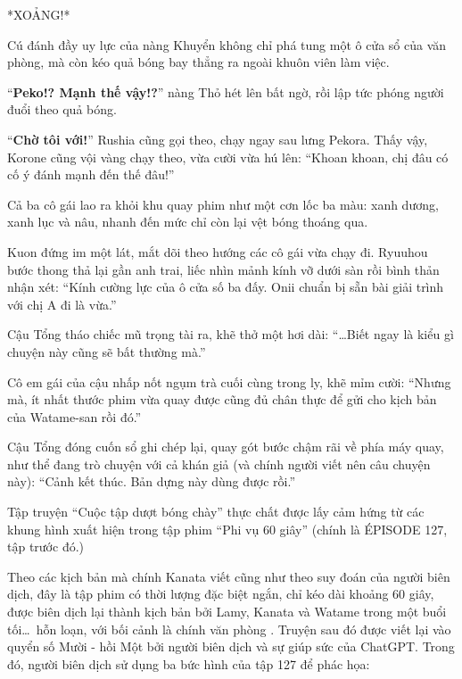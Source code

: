 \documentclass[../main.tex]{subfiles}
\begin{document}
*XOẢNG!*

Cú đánh đầy uy lực của nàng Khuyển không chỉ phá tung một ô cửa sổ của văn phòng, mà còn kéo quả bóng bay thẳng ra ngoài khuôn viên làm việc.

``\textbf{Peko!? Mạnh thế vậy!?}'' nàng Thỏ hét lên bất ngờ, rồi lập tức phóng người đuổi theo quả bóng.

``\textbf{Chờ tôi với!}'' Rushia cũng gọi theo, chạy ngay sau lưng Pekora. Thấy vậy, Korone cũng vội vàng chạy theo, vừa cười vừa hú lên: ``Khoan khoan, chị đâu có cố ý đánh mạnh đến thế đâu!''

Cả ba cô gái lao ra khỏi khu quay phim như một cơn lốc ba màu: xanh dương, xanh lục và nâu, nhanh đến mức chỉ còn lại vệt bóng thoáng qua.

Kuon đứng im một lát, mắt dõi theo hướng các cô gái vừa chạy đi. Ryuuhou bước thong thả lại gần anh trai, liếc nhìn mảnh kính vỡ dưới sàn rồi bình thản nhận xét: ``Kính cường lực của ô cửa số ba đấy. Onii chuẩn bị sẵn bài giải trình với chị A đi là vừa.''

Cậu Tổng tháo chiếc mũ trọng tài ra, khẽ thở một hơi dài: ``\dots Biết ngay là kiểu gì chuyện này cũng sẽ bất thường mà.''

Cô em gái của cậu nhấp nốt ngụm trà cuối cùng trong ly, khẽ mỉm cười: ``Nhưng mà, ít nhất thước phim vừa quay được cũng đủ chân thực để gửi cho kịch bản của Watame-san rồi đó.''

Cậu Tổng đóng cuốn sổ ghi chép lại, quay gót bước chậm rãi về phía máy quay, như thể đang trò chuyện với cả khán giả (và chính người viết nên câu chuyện này): ``Cảnh kết thúc. Bản dựng này dùng được rồi.''

\trva

Tập truyện ``Cuộc tập dượt bóng chày'' thực chất được lấy cảm hứng từ các khung hình xuất hiện trong tập phim ``Phi vụ 60 giây'' (chính là {\flaregothic ÉPISODE 127}, tập trước đó.)

Theo các kịch bản mà chính Kanata viết cũng như theo suy đoán của người biên dịch, đây là tập phim có thời lượng đặc biệt ngắn, chỉ kéo dài khoảng 60 giây, được biên dịch lại thành kịch bản bởi Lamy, Kanata và Watame trong một buổi tối\dots\ hỗn loạn, với bối cảnh là chính văn phòng \hll. Truyện sau đó được viết lại vào quyển số Mười - hồi Một bởi người biên dịch và sự giúp sức của ChatGPT. Trong đó, người biên dịch sử dụng ba bức hình của tập 127 để phác họa:
\end{document}
